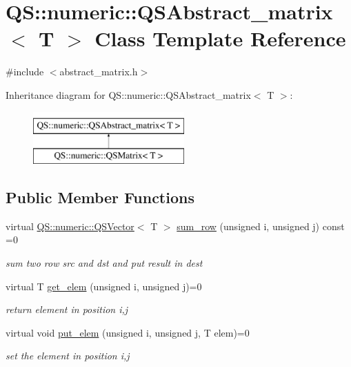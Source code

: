 \hypertarget{classQS_1_1numeric_1_1QSAbstract__matrix}{\section{Q\-S\-:\-:numeric\-:\-:Q\-S\-Abstract\-\_\-matrix$<$ T $>$ Class Template Reference}
\label{classQS_1_1numeric_1_1QSAbstract__matrix}
}


{\ttfamily \#include $<$abstract\-\_\-matrix.\-h$>$}

Inheritance diagram for Q\-S\-:\-:numeric\-:\-:Q\-S\-Abstract\-\_\-matrix$<$ T $>$\-:\begin{figure}[H]
\begin{center}
\leavevmode
\includegraphics[height=2.000000cm]{classQS_1_1numeric_1_1QSAbstract__matrix}
\end{center}
\end{figure}
\subsection*{Public Member Functions}
\begin{DoxyCompactItemize}
\item 
virtual \hyperlink{classQS_1_1numeric_1_1QSVector}{Q\-S\-::numeric\-::\-Q\-S\-Vector}$<$ T $>$ \hyperlink{classQS_1_1numeric_1_1QSAbstract__matrix_ae7f9ede6f0618c4257ef3795d91345c4}{sum\-\_\-row} (unsigned i, unsigned j) const =0
\begin{DoxyCompactList}\small\item\em sum two row src and dst and put result in dest \end{DoxyCompactList}\item 
virtual T \hyperlink{classQS_1_1numeric_1_1QSAbstract__matrix_ad798a4e1c0d5d82c50b4b4391c38c28b}{get\-\_\-elem} (unsigned i, unsigned j)=0
\begin{DoxyCompactList}\small\item\em return element in position i,j \end{DoxyCompactList}\item 
virtual void \hyperlink{classQS_1_1numeric_1_1QSAbstract__matrix_a53bf5fb625017a04691873d5f51e8257}{put\-\_\-elem} (unsigned i, unsigned j, T elem)=0
\begin{DoxyCompactList}\small\item\em set the element in position i,j \end{DoxyCompactList}\end{DoxyCompactItemize}
